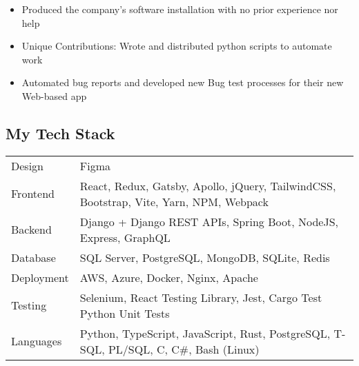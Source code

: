 \documentclass[letterpaper]{article}
\providecommand{\tightlist}{%
  \setlength{\itemsep}{0pt}\setlength{\parskip}{0pt}}
\begin{document}
\begin{itemize}
\tightlist
\item
  Produced the company's software installation with no prior experience
  nor help
\item
  Unique Contributions: Wrote and distributed python scripts to automate
  work
\item
  Automated bug reports and developed new Bug test processes for their
  new Web-based app
\end{itemize}

\hypertarget{my-tech-stack}{%
\subsection{My Tech Stack}\label{my-tech-stack}}

\begin{longtable}[]{@{}
  >{\raggedright\arraybackslash}p{}
  >{\raggedright\arraybackslash}p{}@{}}
\toprule\noalign{}
\endhead
\bottomrule\noalign{}
\endlastfoot
Design & Figma \\
Frontend & React, Redux, Gatsby, Apollo, jQuery, TailwindCSS, Bootstrap,
Vite, Yarn, NPM, Webpack \\
Backend & Django + Django REST APIs, Spring Boot, NodeJS, Express,
GraphQL \\
Database & SQL Server, PostgreSQL, MongoDB, SQLite, Redis \\
Deployment & AWS, Azure, Docker, Nginx, Apache \\
Testing & Selenium, React Testing Library, Jest, Cargo Test Python Unit
Tests \\
Languages & Python, TypeScript, JavaScript, Rust, PostgreSQL, T-SQL,
PL/SQL, C, C\#, Bash (Linux) \\
\end{longtable}
\end{document}
